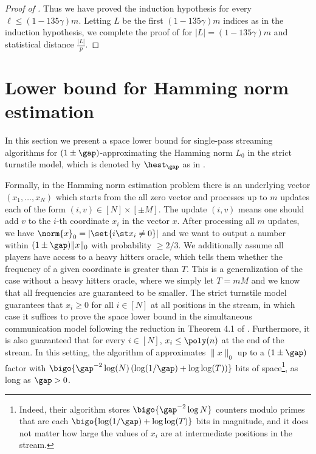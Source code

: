 \begin{proof}[Proof of ]
Thus we have proved the induction hypothesis for every $\ell \le (1-135\gamma) m$.
%
Letting %
$L$ be the first $(1-135\gamma) m$ indices as in the induction hypothesis, 
we complete the proof of  for $|L|= (1-135\gamma) m$ and statistical distance $\frac{|L|}{p}$.
\end{proof}


\section{Lower bound for Hamming norm estimation}
\label{sec:lower bound L0}

In this section we present a space lower bound for single-pass streaming algorithms for $(1\pm \gap)$-approximating the Hamming norm $L_0$ in the strict turnstile model,  which is denoted by $\hest_{\gap}$ as in .

Formally, in the Hamming norm estimation problem there is an underlying vector $(x_1,\dots, x_N)$ which starts from the all zero vector and processes up to $m$ updates each of the form $(i,v)\in [N]\times [\pm M]$.
The update $(i,v)$ means one should add $v$ to the $i$-th coordinate $x_i$ in the vector $x$. 
After processing all $m$ updates, we have $\norm{x}_0 =|\set{i\st x_i\ne 0}|$ and we want to output a number within $(1\pm\gap)\|x\|_0$ with probability $\ge 2/3$. We additionally assume all players have access to a heavy hitters oracle, which tells them whether the frequency of a given coordinate is greater than $T$. This is a generalization of the case without a heavy hitters oracle, where we simply let $T = mM$ and we know that all frequencies are guaranteed to be smaller.
The strict turnstile model guarantees that $x_i \geq 0$ for all $i \in [N]$ at all positions in the stream,
in which case it suffices to prove the space lower bound in the simultaneous communication model following the reduction in Theorem 4.1 of \cite{AHLW16}.
Furthermore, it is also guaranteed that for every $i \in [N]$,  $x_i \leq \poly(n)$ at the end of the stream. 
In this setting, the algorithm of \cite{KNW10} approximates $\|x\|_0$ up to a $(1 \pm \gap)$ factor with $\bigo{\gap^{-2}\log(N) \left(\log(1/\gap) + \log \log (T) \right)}$ bits of space\footnote{Indeed, their algorithm stores $\bigo{\gap^{-2}\log N}$ counters modulo primes that are each $\bigo{\log(1/\gap) + \log \log (T)}$ bits in magnitude, and it does not matter how large the values of $x_i$ are at intermediate positions in the stream. }, as long as $\gap > 0$.

